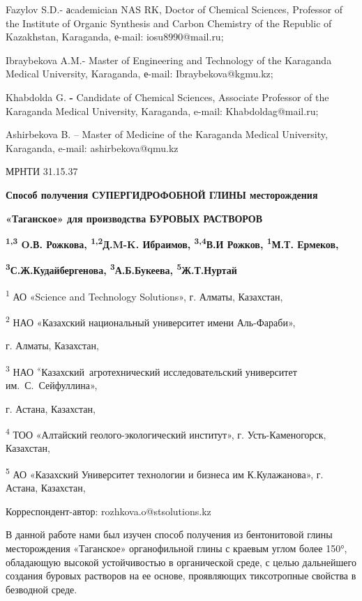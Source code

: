 Fazylov S.D.- аcademician NAS RK, Doctor of Chemical Sciences, Professor
of the Institute of Organic Synthesis and Carbon Chemistry of the
Republic of Kazakhstan, Karaganda, е-mail: iosu8990@mail.ru;

Ibraybekova A.M.- Master of Engineering and Technology of the Karaganda
Medical University, Karaganda, е-mail: Ibraybekova@kgmu.kz;

Khabdolda G. \textbf{-} Candidate of Chemical Sciences, Associate
Professor of the Karaganda Medical University, Karaganda, e-mail:
Khabdoldag@mail.ru;

Ashirbekova B. -- Master of Medicine of the Karaganda Medical
University, Karaganda, e-mail: ashirbekova@qmu.kz

МРНТИ 31.15.37

\textbf{Способ получения СУПЕРГИДРОФОБНОЙ ГЛИНЫ месторождения}

\textbf{«Таганское» для производства БУРОВЫХ РАСТВОРОВ}

\textbf{\textsuperscript{1,3} O.В. Рожкова, \textsuperscript{1,2}Д.M-K.
Ибраимов, \textsuperscript{3,4}В.И Рожков, \textsuperscript{1}М.Т.
Ермеков,}

\textbf{\textsuperscript{3}С.Ж.Кудайбергенова,
\textsuperscript{3}А.Б.Букеева, \textsuperscript{5}Ж.Т.Нуртай}

\textsuperscript{1} АО «Science and Technology Solutions», г. Алматы,
Казахстан,

\textsuperscript{2} НАО «Казахский национальный университет имени
Аль-Фараби»,

г. Алматы, Казахстан,

\textsuperscript{3} НАО \textsuperscript{«}Казахский~агротехнический
исследовательский университет им.~С.~Сейфуллина»,

г. Астана, Казахстан,

\textsuperscript{4} ТОО «Алтайский геолого-экологический институт», г.
Усть-Каменогорск, Казахстан,

\textsuperscript{5} АО «Казахский Университет технологии и бизнеса им
К.Кулажанова», г. Астана, Казахстан,

Корреспондент-автор: rozhkova.o@stsolutions.kz

В данной работе нами был изучен способ получения из бентонитовой глины
месторождения «Таганское» органофильной глины с краевым углом более
150°, обладающую высокой устойчивостью в органической среде, с целью
дальнейшего создания буровых растворов на ее основе, проявляющих
тиксотропные свойства в безводной среде.

